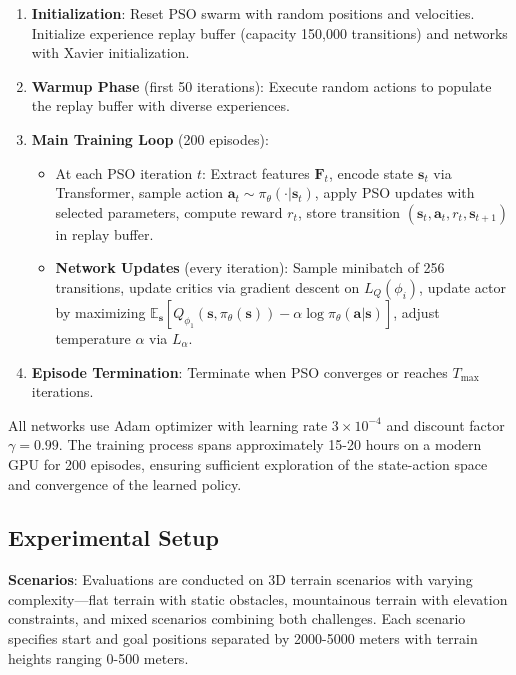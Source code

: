 \documentclass[fleqn,10pt]{wlscirep}
\begin{document}
\begin{enumerate}
\item \textbf{Initialization}: Reset PSO swarm with random positions and velocities. Initialize experience replay buffer (capacity 150,000 transitions) and networks with Xavier initialization.
\item \textbf{Warmup Phase} (first 50 iterations): Execute random actions to populate the replay buffer with diverse experiences.
\item \textbf{Main Training Loop} (200 episodes):
\begin{itemize}
\item At each PSO iteration $t$: Extract features $\mathbf{F}_t$, encode state $\mathbf{s}_t$ via Transformer, sample action $\mathbf{a}_t \sim \pi_\theta(\cdot|\mathbf{s}_t)$, apply PSO updates with selected parameters, compute reward $r_t$, store transition $(\mathbf{s}_t, \mathbf{a}_t, r_t, \mathbf{s}_{t+1})$ in replay buffer.
\item \textbf{Network Updates} (every iteration): Sample minibatch of 256 transitions, update critics via gradient descent on $L_Q(\phi_i)$, update actor by maximizing $\mathbb{E}_{\mathbf{s}}[Q_{\phi_1}(\mathbf{s}, \pi_\theta(\mathbf{s})) - \alpha \log \pi_\theta(\mathbf{a}|\mathbf{s})]$, adjust temperature $\alpha$ via $L_\alpha$.
\end{itemize}
\item \textbf{Episode Termination}: Terminate when PSO converges or reaches $T_{\max}$ iterations.
\end{enumerate}

All networks use Adam optimizer with learning rate $3 \times 10^{-4}$ and discount factor $\gamma = 0.99$. The training process spans approximately 15-20 hours on a modern GPU for 200 episodes, ensuring sufficient exploration of the state-action space and convergence of the learned policy.

\subsection*{Experimental Setup}

\textbf{Scenarios}: Evaluations are conducted on 3D terrain scenarios with varying complexity---flat terrain with static obstacles, mountainous terrain with elevation constraints, and mixed scenarios combining both challenges. Each scenario specifies start and goal positions separated by 2000-5000 meters with terrain heights ranging 0-500 meters.
\end{document}
